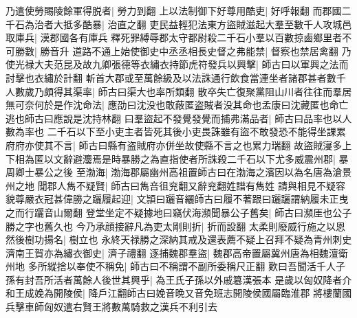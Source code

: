 乃遣使勞賜陵餘軍得脱者|{
	勞力到翻}
上以法制御下好尊用酷吏|{
	好呼報翻}
而郡國二千石為治者大抵多酷暴|{
	治直之翻}
吏民益輕犯法東方盜賊滋起大羣至數千人攻城邑取庫兵|{
	漢郡國各有庫兵}
釋死罪縛辱郡太守都尉殺二千石小羣以百數掠鹵鄉里者不可勝數|{
	勝音升}
道路不通上始使御史中丞丞相長史督之弗能禁|{
	督察也禁居禽翻}
乃使光禄大夫范昆及故九卿張德等衣繡衣持節虎符發兵以興擊|{
	師古曰以軍興之法而討擊也衣繡於計翻}
斬首大郡或至萬餘級及以法誅通行飲食當連坐者諸郡甚者數千人數歲乃頗得其渠率|{
	師古曰渠大也率所類翻}
散卒失亡復聚黨阻山川者往往而羣居無可奈何於是作沈命法|{
	應劭曰沈没也敢蔽匿盗賊者没其命也孟康曰沈藏匿也命亡逃也師古曰應說是沈持林翻}
曰羣盜起不發覺發覺而捕弗滿品者|{
	師古曰品率也以人數為率也}
二千石以下至小吏主者皆死其後小吏畏誅雖有盜不敢發恐不能得坐課累府府亦使其不言|{
	師古曰縣有盗賊府亦併坐故使縣不言之也累力瑞翻}
故盜賊寖多上下相為匿以文辭避灋焉是時暴勝之為直指使者所誅殺二千石以下尤多威震州郡|{
	暴周卿士暴公之後}
至渤海|{
	渤海郡屬幽州高祖置師古曰在渤海之濱因以為名唐為滄景州之地}
聞郡人雋不疑賢|{
	師古曰雋咅徂兖翻又辭兖翻姓譜有雋姓}
請與相見不疑容貌尊嚴衣冠甚偉勝之躧履起迎|{
	文頴曰躧音纚師古曰履不著跟曰躧躧謂納履未正曳之而行躧音山爾翻}
登堂坐定不疑據地曰竊伏海瀕聞暴公子舊矣|{
	師古曰瀕厓也公子勝之字也舊久也}
今乃承顔接辭凡為吏太剛則折|{
	折而設翻}
太柔則廢威行施之以恩然後樹功揚名|{
	樹立也}
永終天禄勝之深納其戒及還表薦不疑上召拜不疑為青州刺史濟南王賀亦為繡衣御史|{
	濟子禮翻}
逐捕魏郡羣盜|{
	魏郡高帝置屬冀州唐為相魏澶衛州地}
多所縱捨以奉使不稱免|{
	師古曰不稱謂不副所委稱尺正翻}
歎曰吾聞活千人子孫有封吾所活者萬餘人後世其興乎|{
	為王氏子孫以外戚簒漢張本}
是歲以匈奴降者介和王成娩為開陵侯|{
	降戶江翻師古曰娩音晩又音免班志開陵侯國屬臨淮郡}
將樓蘭國兵擊車師匈奴遣右賢王將數萬騎救之漢兵不利引去

